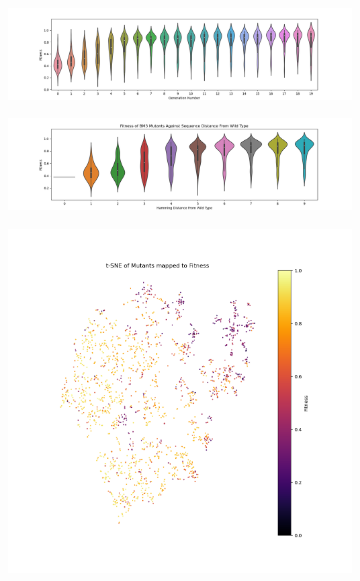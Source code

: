 \documentclass{article}
\begin{document}
\begin{figure}[H]
	\caption{\label{experiment-1} \ref{violin} Violin plot showing the gradual improvement in fitness distributions \textbf{equation \ref{eqn}} over generations of virtual directed evolution in \textbf{experiment 1}. Fitness is a rescaled from the ordinal score such that 1 is the best score and 0 the worst.  \ref{hamming} Fitness increase with $n$ mutations relative to the wild type. \ref{tsne} t-Stochastic Neighbour Embedding (t-SNE) plot of the fitness landscape mapped in \textbf{experiment 1}, where clusters of points represent mutants with similar chemical properties in their active sites and color is mapped to a rescaled score where 1 is the best and 0 is the worst.}
	\begin{subfigure}{0.49\linewidth} 
		\caption{\label{violin}}
	\includegraphics[width=\textwidth]{figs/molcv-fitness-violin.png}
	\end{subfigure}
	\begin{subfigure}{0.49\linewidth}
		\caption{\label{hamming}}
		\includegraphics[width=\textwidth]{figs/hamming-violin.png}
	\end{subfigure}
	\begin{subfigure}{0.9\linewidth}
		\caption{\label{tsne}}
	\includegraphics[width=\textwidth]{figs/moclv-tsne.png}

\end{subfigure}
\end{figure}
\end{document}
